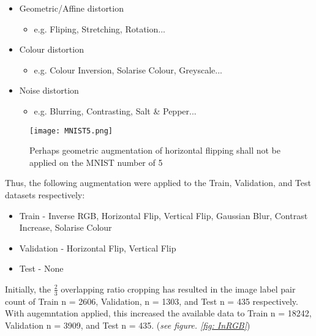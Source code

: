 \documentclass[11pt, a4paper, twoside]{report}
\begin{document}
\begin{itemize}
  \item Geometric/Affine distortion
    \begin{itemize}
      \item e.g. Fliping, Stretching, Rotation...
    \end{itemize}
\end{itemize}
\begin{itemize}
  \item Colour distortion
    \begin{itemize}
      \item e.g. Colour Inversion, Solarise Colour, Greyscale...
    \end{itemize}
\end{itemize}
\begin{itemize}
  \item Noise distortion
    \begin{itemize}
      \item e.g. Blurring, Contrasting, Salt \& Pepper...
    \end{itemize}
\end{itemize}


\begin{figure}[H]
  \centering
  \texttt{[image: MNIST5.png]}
  \caption{Perhaps geometric augmentation of horizontal flipping shall not be applied on the MNIST number of 5}
  \label{fig:MNIST5}
\end{figure}

Thus, the following augmentation were applied to the Train, Validation, and Test datasets respectively:\\\par

\begin{itemize}
  \item Train - Inverse RGB, Horizontal Flip, Vertical Flip, Gaussian Blur, Contrast Increase, Solarise Colour
  \item Validation - Horizontal Flip, Vertical Flip
  \item Test - None
\end{itemize}

Initially, the $\frac{2}{3}$ overlapping ratio cropping has resulted in the image label pair count of Train n = 2606, Validation, n = 1303, and Test n = 435 respectively. With augemntation applied, this increased the available data to Train n = 18242, Validation n = 3909, and Test n = 435. (\textit{see figure. \ref{fig: InRGB}})
\end{document}
